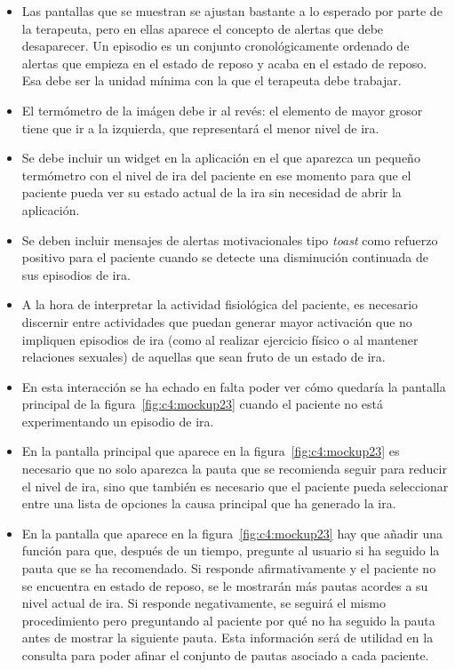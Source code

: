 \begin{itemize}
    \item Las pantallas que se muestran se ajustan bastante a lo esperado por parte de la terapeuta, pero en ellas aparece el concepto de alertas que debe desaparecer. Un episodio es un conjunto cronológicamente ordenado de alertas que empieza en el estado de reposo y acaba en el estado de reposo. Esa debe ser la unidad mínima con la que el terapeuta debe trabajar.
    \item El termómetro de la imágen debe ir al revés: el elemento de mayor grosor tiene que ir a la izquierda, que representará el menor nivel de ira.
    \item Se debe incluir un widget en la aplicación en el que aparezca un pequeño termómetro con el nivel de ira del paciente en ese momento para que el paciente pueda ver su estado actual de la ira sin necesidad de abrir la aplicación.
    \item Se deben incluir mensajes de alertas motivacionales tipo \textit{toast} como refuerzo positivo para el paciente cuando se detecte una disminución continuada de sus episodios de ira.
    \item A la hora de interpretar la actividad fisiológica del paciente, es necesario discernir entre actividades que puedan generar mayor activación que no impliquen episodios de ira (como al realizar ejercicio físico o al mantener relaciones sexuales) de aquellas que sean fruto de un estado de ira.
    \item En esta interacción se ha echado en falta poder ver cómo quedaría la pantalla principal de la figura~\ref{fig:c4:mockup23} cuando el paciente no está experimentando un episodio de ira.
    \item En la pantalla principal que aparece en la figura~\ref{fig:c4:mockup23} es necesario que no solo aparezca la pauta que se recomienda seguir para reducir el nivel de ira, sino que también es necesario que el paciente pueda seleccionar entre una lista de opciones la causa principal que ha generado la ira.
    \item En la pantalla que aparece en la figura~\ref{fig:c4:mockup23} hay que añadir una función para que, después de un tiempo, pregunte al usuario si ha seguido la pauta que se ha recomendado. Si responde afirmativamente y el paciente no se encuentra en estado de reposo, se le mostrarán más pautas acordes a su nivel actual de ira. Si responde negativamente, se seguirá el mismo procedimiento pero preguntando al paciente por qué no ha seguido la pauta antes de mostrar la siguiente pauta. Esta información será de utilidad en la consulta para poder afinar el conjunto de pautas asociado a cada paciente.
\end{itemize}

